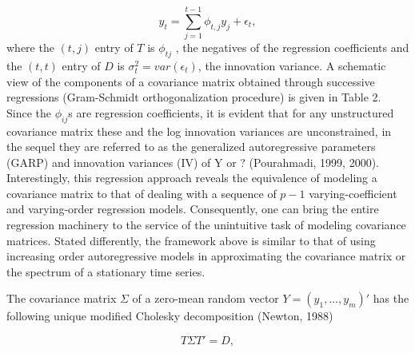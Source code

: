 \documentclass[12pt]{article}
\theoremstyle{definition}
\begin{document}
{{{{\begin{equation}
y_t = \sum_{j = 1}^{t-1} \phi_{t,j} y_j + \epsilon_t,
\end{equation}
\noindent
where the $\left(t, j\right)$ entry of $T$ is $\phi_{tj}$ , the negatives of the regression coefficients and the $(t, t)$ entry of $D$ is $\sigma_t^2 = var\left(\epsilon_t\right)$, the innovation variance. A schematic view of the components of a covariance matrix obtained through successive regressions (Gram-Schmidt orthogonalization procedure) is given in Table 2. Since the $\phi_{ij}$s are regression coefficients, it is evident that for any unstructured covariance matrix these and the log innovation variances are unconstrained, in the sequel they are referred to as the generalized autoregressive parameters (GARP) and innovation variances (IV) of Y or ? (Pourahmadi, 1999, 2000). Interestingly, this regression approach reveals the equivalence of modeling a covariance matrix to that of dealing with a sequence of $p - 1$ varying-coefficient and varying-order regression models. Consequently, one can bring the entire regression machinery to the service of the unintuitive task of modeling covariance matrices. Stated differently, the framework above is similar to that of using increasing order autoregressive models in approximating the covariance matrix or the spectrum of a stationary time series.}}

The covariance matrix $\Sigma$ of a zero-mean random vector $Y = \left(y_1, \dots , y_m\right)'$ has the following unique modified Cholesky decomposition (Newton, 1988)

\begin{equation} \label{eq:cholesky-matrix-decomposition}
T \Sigma T' = D, 
\end{equation}

}}
\end{document}
